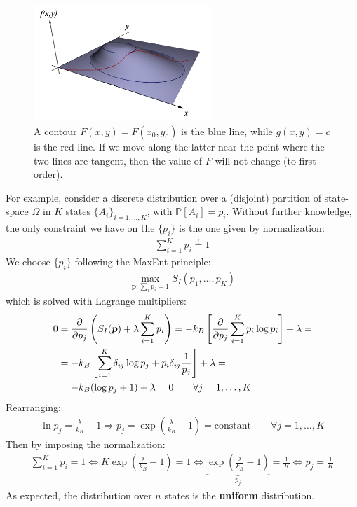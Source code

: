 \documentclass[../../main.tex]{subfiles}
\begin{document}
\begin{figure}[H]
    \centering
    \includegraphics[width=0.6\textwidth]{contours.png}
    \caption{A contour $F(x,y) = F(x_0,y_0)$ is the blue line, while $g(x,y) = c$ is the red line. If we move along the latter near the point where the two lines are tangent, then the value of $F$ will not change (to first order). }
    \label{fig:contours}
\end{figure}


For example, consider a discrete distribution over a (disjoint) partition of state-space $\Omega$ in $K$ states $\{A_i\}_{i=1,\dots,K}$, with $\mathbb{P}[A_i] = p_i$. Without further knowledge, the only constraint we have on the $\{p_i\}$ is the one given by normalization:
\begin{align*}
    \sum_{i=1}^K p_i \overset{!}{=}  1
\end{align*}
We choose $\{p_i\}$ following the MaxEnt principle:
\begin{align*}
    \max_{\bm{p} \colon \sum_i p_i = 1} S_I(p_1, \dots, p_K)
\end{align*}
which is solved with Lagrange multipliers:
\begin{align*}
    0 &= \pdv{p_j} \left(S_I(\bm{p}) + \lambda \sum_{i=1}^K p_i\right) = -k_B \left[\pdv{p_j} \sum_{i=1}^K p_i \log p_i \right] + \lambda=\\
    &= -k_B \left[\sum_{i=1}^K \delta_{ij} \log p_j + p_i \delta_{ij} \frac{1}{p_j} \right] + \lambda =\\
    &= -k_B(\log p_j + 1) + \lambda = 0 \qquad \forall j=1,\dots,K
\end{align*}
Rearranging:
\begin{align*}
    \ln p_j = \frac{\lambda}{k_B} - 1 \Rightarrow p_j = \exp\left(\frac{\lambda}{k_B} -1 \right)  = \text{constant}  \qquad \forall j=1,\dots,K
\end{align*}
Then by imposing the normalization:
\begin{align*}
    \sum_{i=1}^K p_i = 1 \Leftrightarrow 
    K \exp\left(\frac{\lambda}{k_B} - 1 \right) = 1 \Leftrightarrow \underbrace{\exp\left(\frac{\lambda}{k_B} - 1 \right) }_{p_j} = \frac{1}{K} \Leftrightarrow p_j = \frac{1}{K}  
\end{align*}
As expected, the  distribution over $n$ states is the \textbf{uniform} distribution. 
\end{document}
